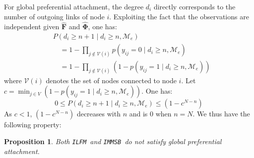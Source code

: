 \documentclass[journal]{IEEEtran}
\newcommand{\ifm}{\texttt{ILFM}}
\newcommand{\imb}{\texttt{IMMSB}}
\newcommand{\pr}{P}
\newcommand{\mat}[1]{\mathbf{#1}}
\newtheorem{proposition}{Proposition}[section]
\begin{document}
For global preferential attachment, the degree $d_i$ directly corresponds to the number of outgoing links of node $i$. Exploiting the fact that the observations are independent given $\mat{\hat{F}}$ and $\mat{\hat{\Phi}}$, one has:
%
\begin{align}
&\pr(d_{i} \ge n+1 \mid d_{i} \ge n, \mathcal{M}_e) \nonumber \\
& \quad= 1 - \prod_{j \notin \mathcal{V}(i)} p(y_{ij} = 0 \mid d_{i} \ge n, \mathcal{M}_e) \nonumber \\
& \quad = 1 - \prod_{j \notin \mathcal{V}(i)} (1 - p(y_{ij} = 1 \mid d_{i} \ge n, \mathcal{M}_e)) \nonumber
\end{align}
%
where $\mathcal{V}(i)$ denotes the set of nodes connected to node $i$. Let $c=\min_{j \in V}  (1-p(y_{ij} = 1 \mid d_{i} \ge n, \mathcal{M}_e))$. One has:
%
\[
0 \le \pr(d_{i} \ge n+1 \mid d_{i} \ge n, \mathcal{M}_e) \le (1 - c^{N-n})
\]
%
As $c < 1$,  $(1 - c^{N-n})$ decreases with $n$ and is $0$ when $n=N$. We thus have the following property:~\\

%
\begin{proposition}
\label{pref-attch-glob}
Both \ifm\ and \imb\ do not satisfy global preferential attachment.
\end{proposition}~\\
\end{document}

